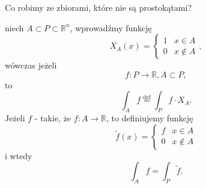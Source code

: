 \documentclass[../main.tex]{subfiles}
\begin{document}
\begin{pytanie}
    Co robimy ze zbiorami, które nie są prostokątami?
\end{pytanie}
\begin{przyklad}
    niech $A\subset P\subset \mathbb{R}^n$, wprowadźmy funkcję
    \[
        X_A(x) = \begin{cases}
            1 &x\in A\\
            0 &x\not\in A
        \end{cases}
    ,\]
wówczas jeżeli
\[
f: P\to\mathbb{R}, A\subset P
,\]
to
\[
\int_{A}f \overset{\text{def}}{=} \int_{P} f \cdot X_A
.\]
Jeżeli $f$ - takie, że $f: A\to\mathbb{R}$, to definiujemy funkcję
\[
    \tilde f(x) = \begin{cases}
        f &x\in A\\
        0 &x\not\in A
    \end{cases}
\]
i wtedy
\[
    \int_{A} f = \int_{P} \tilde f
.\]
\end{przyklad}
\end{document}
